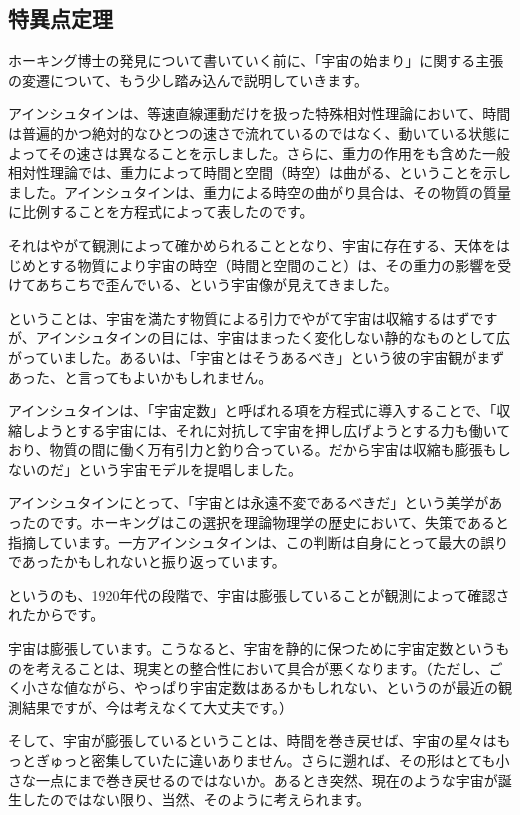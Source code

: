 \documentclass[10pt,b5paper,papersize,dvipdfmx]{jsbook}
\begin{document}
\subsection{特異点定理}
ホーキング博士の発見について書いていく前に、「宇宙の始まり」に関する主張の変遷について、もう少し踏み込んで説明していきます。\par
アインシュタインは、等速直線運動だけを扱った特殊相対性理論において、時間は普遍的かつ絶対的なひとつの速さで流れているのではなく、動いている状態によってその速さは異なることを示しました。さらに、重力の作用をも含めた一般相対性理論では、重力によって時間と空間（時空）は曲がる、ということを示しました。アインシュタインは、重力による時空の曲がり具合は、その物質の質量に比例することを方程式によって表したのです。\par
それはやがて観測によって確かめられることとなり、宇宙に存在する、天体をはじめとする物質により宇宙の時空（時間と空間のこと）は、その重力の影響を受けてあちこちで歪んでいる、という宇宙像が見えてきました。\par
ということは、宇宙を満たす物質による引力でやがて宇宙は収縮するはずですが、アインシュタインの目には、宇宙はまったく変化しない静的なものとして広がっていました。あるいは、「宇宙とはそうあるべき」という彼の宇宙観がまずあった、と言ってもよいかもしれません。\par
アインシュタインは、「宇宙定数」と呼ばれる項を方程式に導入することで、「収縮しようとする宇宙には、それに対抗して宇宙を押し広げようとする力も働いており、物質の間に働く万有引力と釣り合っている。だから宇宙は収縮も膨張もしないのだ」という宇宙モデルを提唱しました。\par
アインシュタインにとって、「宇宙とは永遠不変であるべきだ」という美学があったのです。ホーキングはこの選択を理論物理学の歴史において、失策であると指摘しています。一方アインシュタインは、この判断は自身にとって最大の誤りであったかもしれないと振り返っています。\par
というのも、1920年代の段階で、宇宙は膨張していることが観測によって確認されたからです。\par
宇宙は膨張しています。こうなると、宇宙を静的に保つために宇宙定数というものを考えることは、現実との整合性において具合が悪くなります。（ただし、ごく小さな値ながら、やっぱり宇宙定数はあるかもしれない、というのが最近の観測結果ですが、今は考えなくて大丈夫です。）\par
そして、宇宙が膨張しているということは、時間を巻き戻せば、宇宙の星々はもっとぎゅっと密集していたに違いありません。さらに遡れば、その形はとても小さな一点にまで巻き戻せるのではないか。あるとき突然、現在のような宇宙が誕生したのではない限り、当然、そのように考えられます。\par
\end{document}
